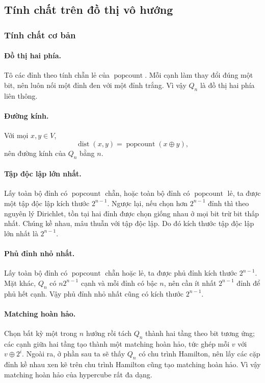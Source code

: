 \documentclass[11pt]{article}
\begin{document}
\subsection{Tính chất trên đồ thị vô hướng}

\subsubsection{Tính chất cơ bản}

\paragraph{Đồ thị hai phía.}
Tô các đỉnh theo tính chẵn lẻ của \(\operatorname{popcount}\). Mỗi cạnh làm
thay đổi đúng một bit, nên luôn nối một đỉnh đen với một đỉnh trắng. Vì vậy
\(Q_n\) là đồ thị hai phía liên thông.

\paragraph{Đường kính.}
Với mọi \(x,y\in V\),
\[
  \operatorname{dist}(x,y)=\operatorname{popcount}(x\oplus y),
\]
nên đường kính của \(Q_n\) bằng \(n\).

\paragraph{Tập độc lập lớn nhất.}
Lấy toàn bộ đỉnh có \(\operatorname{popcount}\) chẵn, hoặc toàn bộ đỉnh có
\(\operatorname{popcount}\) lẻ, ta được một tập độc lập kích thước \(2^{n-1}\).
Ngược lại, nếu chọn hơn \(2^{n-1}\) đỉnh thì theo nguyên lý Dirichlet, tồn tại
hai đỉnh được chọn giống nhau ở mọi bit trừ bit thấp nhất. Chúng kề nhau, mâu
thuẫn với tập độc lập. Do đó kích thước tập độc lập lớn nhất là \(2^{n-1}\).

\paragraph{Phủ đỉnh nhỏ nhất.}
Lấy toàn bộ đỉnh có \(\operatorname{popcount}\) chẵn hoặc lẻ, ta được phủ đỉnh
kích thước \(2^{n-1}\). Mặt khác, \(Q_n\) có \(n2^{n-1}\) cạnh và mỗi đỉnh có
bậc \(n\), nên cần ít nhất \(2^{n-1}\) đỉnh để phủ hết cạnh. Vậy phủ đỉnh nhỏ
nhất cũng có kích thước \(2^{n-1}\).

\paragraph{Matching hoàn hảo.}
Chọn bất kỳ một trong \(n\) hướng rồi tách \(Q_n\) thành hai tầng theo bit
tương ứng; các cạnh giữa hai tầng tạo thành một matching hoàn hảo, tức ghép
mỗi \(v\) với \(v\oplus 2^i\). Ngoài ra, ở phần sau ta sẽ thấy \(Q_n\) có chu
trình Hamilton, nên lấy các cặp đỉnh kề nhau xen kẽ trên chu trình Hamilton
cũng tạo matching hoàn hảo. Vì vậy matching hoàn hảo của hypercube rất đa
dạng.
\end{document}
